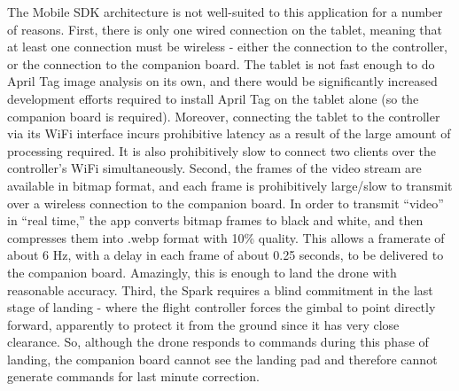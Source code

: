The Mobile SDK architecture is not well-suited to this application for a number of reasons.
First, there is only one wired connection on the tablet, meaning that at least one connection
must be wireless - either the connection to the controller, or the connection to the companion board.
The tablet is not fast enough to do April Tag image analysis on its own,
and there would be significantly increased development efforts required to install April Tag
on the tablet alone (so the companion board is required).
Moreover, connecting the tablet to the controller via its WiFi interface incurs prohibitive latency
as a result of the large amount of processing required.
It is also prohibitively slow to connect two clients over the controller's WiFi simultaneously.
Second, the frames of the video stream are available in bitmap format,
and each frame is prohibitively large/slow to transmit over a wireless connection to the companion board.
In order to transmit ``video'' in ``real time,'' the app converts bitmap frames to black and white,
and then compresses them into .webp format with 10\% quality.
This allows a framerate of about 6 Hz, with a delay in each frame of about 0.25 seconds,
to be delivered to the companion board.
Amazingly, this is enough to land the drone with reasonable accuracy.
Third, the Spark requires a blind commitment in the last stage of landing
- where the flight controller forces the gimbal to point directly forward,
apparently to protect it from the ground since it has very close clearance.
So, although the drone responds to commands during this phase of landing,
the companion board cannot see the landing pad and therefore cannot generate commands
for last minute correction.